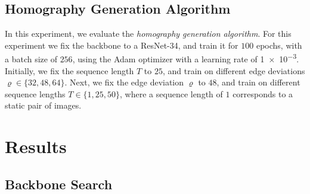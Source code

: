 \subsection{Homography Generation Algorithm}
In this experiment, we evaluate the \textit{homography generation algorithm}. For this experiment we fix the backbone to a ResNet-34, and train it for $100$ epochs, with a batch size of $256$, using the Adam optimizer with a learning rate of \num{1e-3}. Initially, we fix the sequence length $T$ to $25$, and train on different edge deviations $\varrho\in\{32,48,64\}$. Next, we fix the edge deviation $\varrho$ to $48$, and train on different sequence lengths $T\in\{1,25,50\}$, where a sequence length of $1$ corresponds to a static pair of images.




\section{Results}






\subsection{Backbone Search}
\label{c2:sec:backbone_search}

